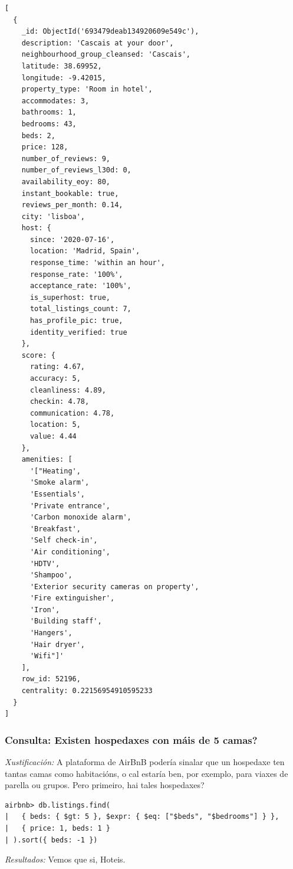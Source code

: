 \documentclass[12pt,a4paper]{article}
\begin{document}
\begin{lstlisting}[style=terminal]
[
  {
    _id: ObjectId('693479deab134920609e549c'),
    description: 'Cascais at your door',
    neighbourhood_group_cleansed: 'Cascais',
    latitude: 38.69952,
    longitude: -9.42015,
    property_type: 'Room in hotel',
    accommodates: 3,
    bathrooms: 1,
    bedrooms: 43,
    beds: 2,
    price: 128,
    number_of_reviews: 9,
    number_of_reviews_l30d: 0,
    availability_eoy: 80,
    instant_bookable: true,
    reviews_per_month: 0.14,
    city: 'lisboa',
    host: {
      since: '2020-07-16',
      location: 'Madrid, Spain',
      response_time: 'within an hour',
      response_rate: '100%',
      acceptance_rate: '100%',
      is_superhost: true,
      total_listings_count: 7,
      has_profile_pic: true,
      identity_verified: true
    },
    score: {
      rating: 4.67,
      accuracy: 5,
      cleanliness: 4.89,
      checkin: 4.78,
      communication: 4.78,
      location: 5,
      value: 4.44
    },
    amenities: [
      '["Heating',
      'Smoke alarm',
      'Essentials',
      'Private entrance',
      'Carbon monoxide alarm',
      'Breakfast',
      'Self check-in',
      'Air conditioning',
      'HDTV',
      'Shampoo',
      'Exterior security cameras on property',
      'Fire extinguisher',
      'Iron',
      'Building staff',
      'Hangers',
      'Hair dryer',
      'Wifi"]'
    ],
    row_id: 52196,
    centrality: 0.22156954910595233
  }
]
\end{lstlisting}

\subsubsection{Consulta: Existen hospedaxes con máis de 5 camas?} 
\label{consulta4}

\emph{Xustificación:} A plataforma de AirBnB podería sinalar que un hospedaxe ten tantas camas como habitacións, o cal estaría ben, por exemplo, para viaxes de parella ou grupos. Pero primeiro, hai tales hospedaxes?

\begin{lstlisting}
airbnb> db.listings.find(
|   { beds: { $gt: 5 }, $expr: { $eq: ["$beds", "$bedrooms"] } },
|   { price: 1, beds: 1 }
| ).sort({ beds: -1 })
\end{lstlisting}

\emph{Resultados:} Vemos que si, Hoteis.
\end{document}

